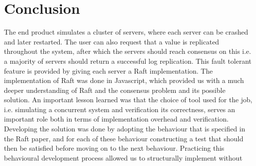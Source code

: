 \section{Conclusion} %
\label{sec:conclusion}
The end product simulates a cluster of servers, where each server can be crashed and later restarted. The user can also request that a value is replicated throughout the system, after which the servers should reach consensus on this i.e. a majority of servers should return a successful log replication. This fault tolerant feature is provided by giving each server a Raft implementation.
The implementation of Raft was done in Javascript, which provided us with a much deeper understanding of Raft and the consensus problem and its possible solution. An important lesson learned was that the choice of tool used for the job, i.e. simulating a concurrent system and verification its correctness, serves an important role both in terms of implementation overhead and verification.
Developing the solution was done by adopting the behaviour that is specified in the Raft paper, and for each of these behaviour constructing a test that should then be satisfied before moving on to the next behaviour. Practicing this behavioural development process allowed us to structurally implement without 
